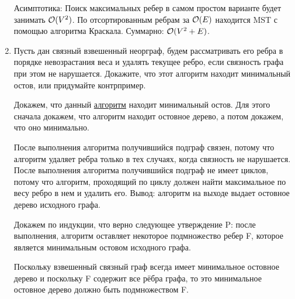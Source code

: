 \begin{enumerate}
\begin{solution}
      Асимптотика:
      Поиск максимальных ребер в самом простом варианте будет занимать $\mathcal{O}(V^2)$. По отсортированным ребрам за $\mathcal{O}(E)$ находится MST с помощью алгоритма Краскала. Суммарно: $\mathcal{O}(V^2 + E)$.
    \end{solution}

  \item
    Пусть дан связный взвешенный неорграф, будем рассматривать его ребра в порядке невозрастания веса и
    удалять текущее ребро, если связность графа при этом не нарушается. Докажите, что этот алгоритм
    находит минимальный остов, или придумайте контрпример.

    \begin{solution}
      Докажем, что данный \href{https://ru.wikipedia.org/wiki/%D0%90%D0%BB%D0%B3%D0%BE%D1%80%D0%B8%D1%82%D0%BC_%D0%BE%D0%B1%D1%80%D0%B0%D1%82%D0%BD%D0%BE%D0%B3%D0%BE_%D1%83%D0%B4%D0%B0%D0%BB%D0%B5%D0%BD%D0%B8%D1%8F}{алгоритм} находит минимальный остов. Для этого сначала докажем, что алгоритм находит остовное дерево, а потом докажем, что оно минимально.

      После выполнения алгоритма получившийся подграф связен, потому что алгоритм удаляет ребра только в тех случаях, когда связность не нарушается. После выполнения алгоритма получившийся подграф не имеет циклов, потому что алгоритм, проходящий по циклу должен найти максимальное по весу ребро в нем и удалить его. Вывод: алгоритм на выходе выдает остовное дерево исходного графа.

      Докажем по индукции, что верно следующее утверждение P: после выполнения, алгоритм оставляет некоторое подмножество ребер F, которое является минимальным остовом исходного графа.
      
      Поскольку взвешенный связный граф всегда имеет минимальное остовное дерево и поскольку F содержит все рёбра графа, то это минимальное остовное дерево должно быть подмножеством F.
      

\end{solution}
\end{enumerate}
